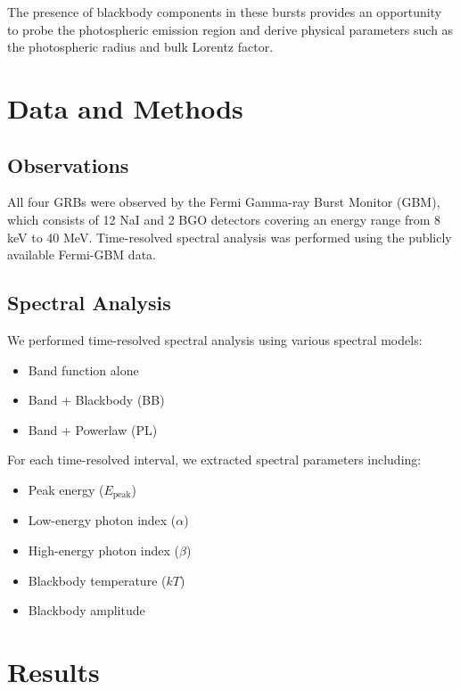 \documentclass[twocolumn]{aastex631}
\begin{document}
    The presence of blackbody components in these bursts provides an opportunity to probe the photospheric emission region and derive physical parameters such as the photospheric radius and bulk Lorentz factor.


    \section{Data and Methods}
    \label{sec:methods}

    \subsection{Observations}\label{subsec:observations}

    All four GRBs were observed by the Fermi Gamma-ray Burst Monitor (GBM), which consists of 12 NaI and 2 BGO detectors covering an energy range from 8 keV to 40 MeV\@.
    Time-resolved spectral analysis was performed using the publicly available Fermi-GBM data.

    \subsection{Spectral Analysis}\label{subsec:spectral-analysis}

    We performed time-resolved spectral analysis using various spectral models:
    \begin{itemize}
        \item Band function alone
        \item Band + Blackbody (BB)
        \item Band + Powerlaw (PL)
    \end{itemize}

    For each time-resolved interval, we extracted spectral parameters including:
    \begin{itemize}
        \item Peak energy ($E_{\text{peak}}$)
        \item Low-energy photon index ($\alpha$)
        \item High-energy photon index ($\beta$)
        \item Blackbody temperature ($kT$)
        \item Blackbody amplitude
    \end{itemize}


    \section{Results}
    \label{sec:results}
\end{document}
